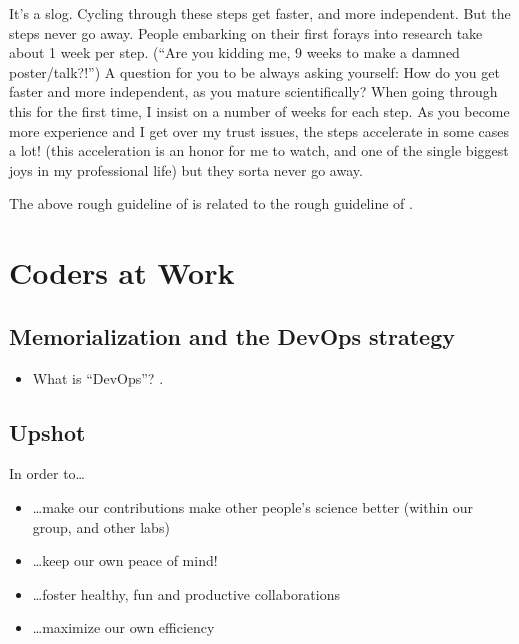 \documentclass[letterpaper,10pt,english]{sphinxmanual}
\begin{document}
\sphinxAtStartPar
It’s a slog. Cycling through these steps get faster, and more independent. But the steps never go away.
People embarking on their first forays into research take about 1 week per step. (“Are you kidding me, 9 weeks to make a damned poster/talk?!”)
A question for you to be always asking yourself: How do you get faster and more independent, as you mature scientifically?
When going through this for the first time, I insist on a number of weeks for each step.
As you become more experience and I get over my trust issues, the steps accelerate \textendash{}in some cases a lot! (this acceleration is an honor for me to watch, and one of the single biggest joys in my professional life) \textendash{} but they sorta never go away.

\sphinxAtStartPar
The above rough guideline of  is related to the rough guideline of {\hyperref[\detokenize{PaperWritingTips:paperwritingtips}]{}}.

\sphinxstepscope


\chapter{Coders at Work}
\label{\detokenize{03CodersAtWork:coders-at-work}}\label{\detokenize{03CodersAtWork:codersatwork}}\label{\detokenize{03CodersAtWork::doc}}

\section{Memorialization and the DevOps strategy}
\label{\detokenize{03CodersAtWork:memorialization-and-the-devops-strategy}}\begin{itemize}
\item {} 
\sphinxAtStartPar
What is “DevOps”? .

\end{itemize}


\section{Upshot}
\label{\detokenize{03CodersAtWork:upshot}}
\sphinxAtStartPar
In order to…
\begin{itemize}
\item {} 
\sphinxAtStartPar
…make our contributions make other people’s science better (within our group, and other labs)

\item {} 
\sphinxAtStartPar
…keep our own peace of mind!

\item {} 
\sphinxAtStartPar
…foster healthy, fun and productive collaborations

\item {} 
\sphinxAtStartPar
…maximize our own efficiency

\end{itemize}
\end{document}
